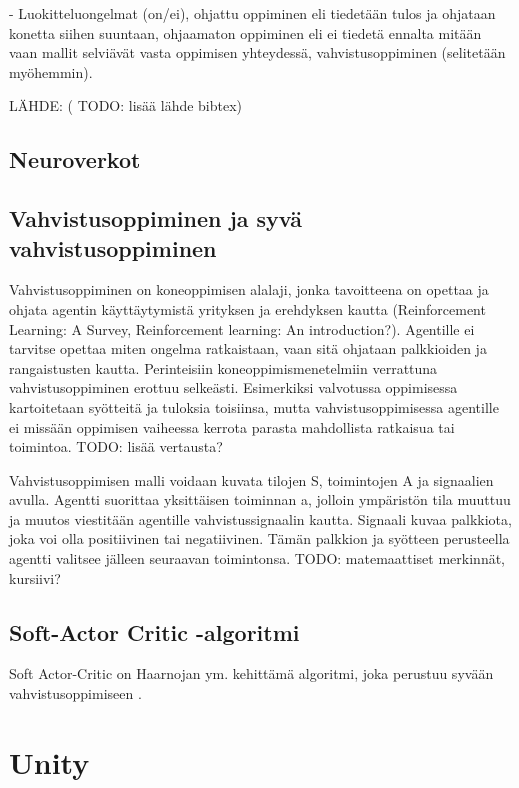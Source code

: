 \documentclass[utf8]{gradu3}
\begin{document}
- Luokitteluongelmat (on/ei), ohjattu oppiminen eli tiedetään tulos ja ohjataan konetta siihen suuntaan, ohjaamaton oppiminen eli ei tiedetä ennalta mitään vaan mallit selviävät vasta oppimisen yhteydessä, vahvistusoppiminen (selitetään myöhemmin).

LÄHDE: (\parencite{jordan2015machine} TODO: lisää lähde bibtex)

\section{Neuroverkot}

\section{Vahvistusoppiminen ja syvä vahvistusoppiminen}

Vahvistusoppiminen on koneoppimisen alalaji, jonka tavoitteena on opettaa ja ohjata agentin käyttäytymistä yrityksen ja erehdyksen kautta (Reinforcement Learning: A Survey, Reinforcement learning: An introduction?). Agentille ei tarvitse opettaa miten ongelma ratkaistaan, vaan sitä ohjataan palkkioiden ja rangaistusten kautta. Perinteisiin koneoppimismenetelmiin verrattuna vahvistusoppiminen erottuu selkeästi. Esimerkiksi valvotussa oppimisessa kartoitetaan syötteitä ja tuloksia toisiinsa, mutta vahvistusoppimisessa agentille ei missään oppimisen vaiheessa kerrota parasta mahdollista ratkaisua tai toimintoa. TODO: lisää vertausta?

Vahvistusoppimisen malli voidaan kuvata tilojen S, toimintojen A ja signaalien avulla. Agentti suorittaa yksittäisen toiminnan a, jolloin ympäristön tila muuttuu ja muutos viestitään agentille vahvistussignaalin kautta. Signaali kuvaa palkkiota, joka voi olla positiivinen tai negatiivinen. Tämän palkkion ja syötteen perusteella agentti valitsee jälleen seuraavan toimintonsa. TODO: matemaattiset merkinnät, kursiivi?

\section{Soft-Actor Critic -algoritmi}

Soft Actor-Critic on Haarnojan ym. kehittämä algoritmi, joka perustuu syvään vahvistusoppimiseen \parencite{haarnoja2018soft}. 

\chapter{Unity}
\end{document}
